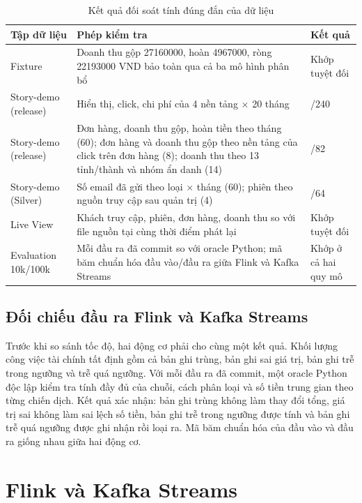 \begin{table}[H]
\centering
\caption{Kết quả đối soát tính đúng đắn của dữ liệu}
\label{tab:correctness}
\small
\renewcommand{\arraystretch}{1.2}
\begin{tabularx}{\textwidth}{>{\raggedright\arraybackslash}p{3.6cm} >{\raggedright\arraybackslash}X >{\raggedright\arraybackslash}p{3.2cm}}
\toprule
\textbf{Tập dữ liệu} & \textbf{Phép kiểm tra} & \textbf{Kết quả} \\
\midrule
Fixture & Doanh thu gộp \num{27160000}, hoàn \num{4967000}, ròng \num{22193000} VND bảo toàn qua cả ba mô hình phân bổ & Khớp tuyệt đối \\
Story-demo (release) & Hiển thị, click, chi phí của 4 nền tảng $\times$ 20 tháng & 240/240 \\
Story-demo (release) & Đơn hàng, doanh thu gộp, hoàn tiền theo tháng (60); đơn hàng và doanh thu gộp theo nền tảng của click trên đơn hàng (8); doanh thu theo 13 tỉnh/thành và nhóm ẩn danh (14) & 82/82 \\
Story-demo (Silver) & Số email đã gửi theo loại $\times$ tháng (60); phiên theo nguồn truy cập sau quản trị (4) & 64/64 \\
Live View & Khách truy cập, phiên, đơn hàng, doanh thu so với file nguồn tại cùng thời điểm phát lại & Khớp tuyệt đối \\
Evaluation 10k/100k & Mỗi đầu ra đã commit so với oracle Python; mã băm chuẩn hóa đầu vào/đầu ra giữa Flink và Kafka Streams & Khớp ở cả hai quy mô \\
\bottomrule
\end{tabularx}
\end{table}

\subsection{Đối chiếu đầu ra Flink và Kafka Streams}
\label{sec:c5-tuong-duong}
Trước khi so sánh tốc độ, hai động cơ phải cho cùng một kết quả. Khối lượng công việc tài chính tất định gồm cả bản ghi trùng, bản ghi sai giá trị, bản ghi trễ trong ngưỡng và trễ quá ngưỡng. Với mỗi đầu ra đã commit, một oracle Python độc lập kiểm tra tính đầy đủ của chuỗi, cách phân loại và số tiền trung gian theo từng chiến dịch. Kết quả xác nhận: bản ghi trùng không làm thay đổi tổng, giá trị sai không làm sai lệch số tiền, bản ghi trễ trong ngưỡng được tính và bản ghi trễ quá ngưỡng được ghi nhận rồi loại ra. Mã băm chuẩn hóa của đầu vào và đầu ra giống nhau giữa hai động cơ.

\section{Flink và Kafka Streams}
\label{sec:c5-flink-vs-streams}

